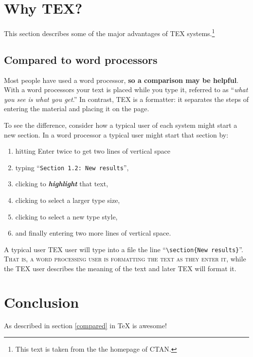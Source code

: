 \documentclass[10pt]{article}
\begin{document}
\section{Why TEX?}

This section describes some of the major advantages of TEX systems.\footnote{This text is taken from the the homepage of CTAN.}

\subsection*{Compared to word processors}
\label{compared}

Most people have used a word processor, \textbf{so a comparison may be helpful}. With a word processors your text is placed while you type it, referred to as ``\textit{what you see is what you get}.'' In contrast, \huge TEX is a formatter: \normalsize it separates the steps of entering the material and placing it on the page.

To see the difference, consider how a typical user of each system might start a new section. In a word processor a typical user might start that section by:
\begin{enumerate}
  \item hitting Enter twice to get two lines of vertical space
  \item typing ``\texttt{Section 1.2: New results}'',
  \item clicking to \textbf{\textit{highlight}} that text,
  \item clicking to select a larger type size,
  \item clicking to select a new type style,
  \vspace{1em}
  \item and finally entering two more lines of vertical space.
\end{enumerate}

\noindent
\hspace{-10em}
A typical user TEX user will type into a file the line ``\verb+\section{New results}+''. \textsc{That is, a word processing user is formatting the text as they enter it}, while the TEX user describes the meaning of the text and later TEX will format it.

\section{Conclusion}

As described in section \ref{compared} in TeX is awesome!
\end{document}
